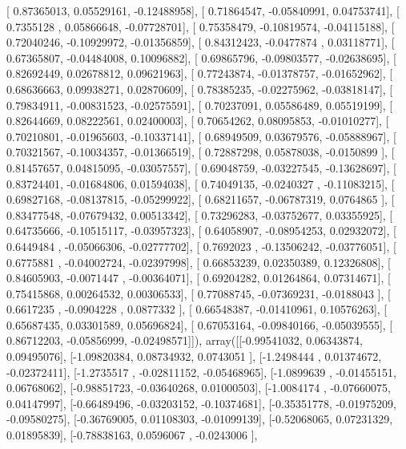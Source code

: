 \documentclass{article}
\begin{document}
       [ 0.87365013,  0.05529161, -0.12488958],
       [ 0.71864547, -0.05840991,  0.04753741],
       [ 0.7355128 ,  0.05866648, -0.07728701],
       [ 0.75358479, -0.10819574, -0.04115188],
       [ 0.72040246, -0.10929972, -0.01356859],
       [ 0.84312423, -0.0477874 ,  0.03118771],
       [ 0.67365807, -0.04484008,  0.10096882],
       [ 0.69865796, -0.09803577, -0.02638695],
       [ 0.82692449,  0.02678812,  0.09621963],
       [ 0.77243874, -0.01378757, -0.01652962],
       [ 0.68636663,  0.09938271,  0.02870609],
       [ 0.78385235, -0.02275962, -0.03818147],
       [ 0.79834911, -0.00831523, -0.02575591],
       [ 0.70237091,  0.05586489,  0.05519199],
       [ 0.82644669,  0.08222561,  0.02400003],
       [ 0.70654262,  0.08095853, -0.01010277],
       [ 0.70210801, -0.01965603, -0.10337141],
       [ 0.68949509,  0.03679576, -0.05888967],
       [ 0.70321567, -0.10034357, -0.01366519],
       [ 0.72887298,  0.05878038, -0.0150899 ],
       [ 0.81457657,  0.04815095, -0.03057557],
       [ 0.69048759, -0.03227545, -0.13628697],
       [ 0.83724401, -0.01684806,  0.01594038],
       [ 0.74049135, -0.0240327 , -0.11083215],
       [ 0.69827168, -0.08137815, -0.05299922],
       [ 0.68211657, -0.06787319,  0.0764865 ],
       [ 0.83477548, -0.07679432,  0.00513342],
       [ 0.73296283, -0.03752677,  0.03355925],
       [ 0.64735666, -0.10515117, -0.03957323],
       [ 0.64058907, -0.08954253,  0.02932072],
       [ 0.6449484 , -0.05066306, -0.02777702],
       [ 0.7692023 , -0.13506242, -0.03776051],
       [ 0.6775881 , -0.04002724, -0.02397998],
       [ 0.66853239,  0.02350389,  0.12326808],
       [ 0.84605903, -0.0071447 , -0.00364071],
       [ 0.69204282,  0.01264864,  0.07314671],
       [ 0.75415868,  0.00264532,  0.00306533],
       [ 0.77088745, -0.07369231, -0.0188043 ],
       [ 0.6617235 , -0.0904228 ,  0.0877332 ],
       [ 0.66548387, -0.01410961,  0.10576263],
       [ 0.65687435,  0.03301589,  0.05696824],
       [ 0.67053164, -0.09840166, -0.05039555],
       [ 0.86712203, -0.05856999, -0.02498571]]), array([[-0.99541032,  0.06343874,  0.09495076],
       [-1.09820384,  0.08734932,  0.0743051 ],
       [-1.2498444 ,  0.01374672, -0.02372411],
       [-1.2735517 , -0.02811152, -0.05468965],
       [-1.0899639 , -0.01455151,  0.06768062],
       [-0.98851723, -0.03640268,  0.01000503],
       [-1.0084174 , -0.07660075,  0.04147997],
       [-0.66489496, -0.03203152, -0.10374681],
       [-0.35351778, -0.01975209, -0.09580275],
       [-0.36769005,  0.01108303, -0.01099139],
       [-0.52068065,  0.07231329,  0.01895839],
       [-0.78838163,  0.0596067 , -0.0243006 ],
\end{document}
